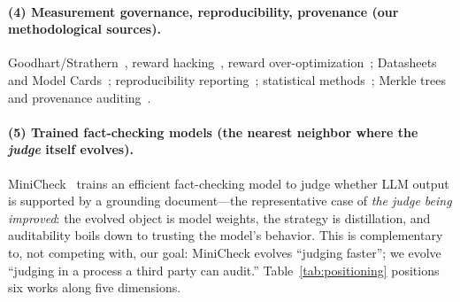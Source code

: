 \documentclass{article}
\begin{document}
\paragraph{(4) Measurement governance, reproducibility, provenance (our methodological sources).}
Goodhart/Strathern~\cite{goodhart1975problems,strathern1997improving}, reward
hacking~\cite{skalse2022rewardhacking}, reward over-optimization~\cite{gao2023scaling};
Datasheets~\cite{gebru2021datasheets} and Model Cards~\cite{mitchell2019modelcards};
reproducibility reporting~\cite{pineau2021improving}; statistical methods~\cite{clopper1934use,
fisher1935design,mcnemar1947note,benjamini1995controlling,holm1979simple,cohen1960coefficient};
Merkle trees~\cite{merkle1988digital} and provenance auditing~\cite{kao2025constantsize,wang2026whoaudits}.

\paragraph{(5) Trained fact-checking models (the nearest neighbor where the \emph{judge} itself evolves).}
MiniCheck~\cite{tang2024minicheck} trains an efficient fact-checking model to judge whether LLM
output is supported by a grounding document---the representative case of \emph{the judge being
improved}: the evolved object is model weights, the strategy is distillation, and auditability
boils down to trusting the model's behavior. This is complementary to, not competing with, our
goal: MiniCheck evolves ``judging faster''; we evolve ``judging in a process a third party can
audit.'' Table~\ref{tab:positioning} positions six works along five dimensions.
\end{document}

